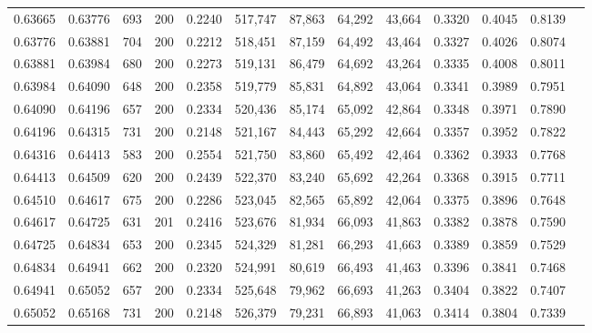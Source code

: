 \begin{tabular}{rrrrrrrrrrrrr}
0.63665 & 0.63776 &   693 & 200 &                                     0.2240 & 517,747 &  87,863 &  64,292 &  43,664 & 0.3320 & 0.4045 & 0.8139 \\
0.63776 & 0.63881 &   704 & 200 &                                     0.2212 & 518,451 &  87,159 &  64,492 &  43,464 & 0.3327 & 0.4026 & 0.8074 \\
0.63881 & 0.63984 &   680 & 200 &                                     0.2273 & 519,131 &  86,479 &  64,692 &  43,264 & 0.3335 & 0.4008 & 0.8011 \\
0.63984 & 0.64090 &   648 & 200 &                                     0.2358 & 519,779 &  85,831 &  64,892 &  43,064 & 0.3341 & 0.3989 & 0.7951 \\
0.64090 & 0.64196 &   657 & 200 &                                     0.2334 & 520,436 &  85,174 &  65,092 &  42,864 & 0.3348 & 0.3971 & 0.7890 \\
0.64196 & 0.64315 &   731 & 200 &                                     0.2148 & 521,167 &  84,443 &  65,292 &  42,664 & 0.3357 & 0.3952 & 0.7822 \\
0.64316 & 0.64413 &   583 & 200 &                                     0.2554 & 521,750 &  83,860 &  65,492 &  42,464 & 0.3362 & 0.3933 & 0.7768 \\
0.64413 & 0.64509 &   620 & 200 &                                     0.2439 & 522,370 &  83,240 &  65,692 &  42,264 & 0.3368 & 0.3915 & 0.7711 \\
0.64510 & 0.64617 &   675 & 200 &                                     0.2286 & 523,045 &  82,565 &  65,892 &  42,064 & 0.3375 & 0.3896 & 0.7648 \\
0.64617 & 0.64725 &   631 & 201 &                                     0.2416 & 523,676 &  81,934 &  66,093 &  41,863 & 0.3382 & 0.3878 & 0.7590 \\
0.64725 & 0.64834 &   653 & 200 &                                     0.2345 & 524,329 &  81,281 &  66,293 &  41,663 & 0.3389 & 0.3859 & 0.7529 \\
0.64834 & 0.64941 &   662 & 200 &                                     0.2320 & 524,991 &  80,619 &  66,493 &  41,463 & 0.3396 & 0.3841 & 0.7468 \\
0.64941 & 0.65052 &   657 & 200 &                                     0.2334 & 525,648 &  79,962 &  66,693 &  41,263 & 0.3404 & 0.3822 & 0.7407 \\
0.65052 & 0.65168 &   731 & 200 &                                     0.2148 & 526,379 &  79,231 &  66,893 &  41,063 & 0.3414 & 0.3804 & 0.7339 \\

\end{tabular}
